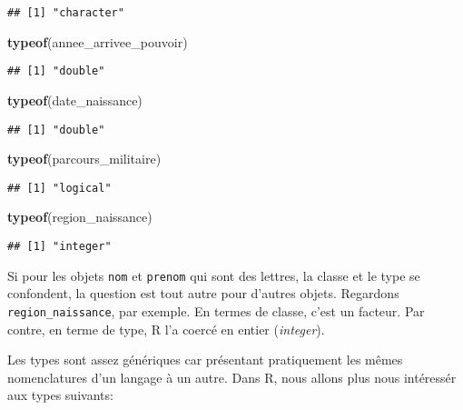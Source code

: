 \documentclass[]{book}
\newenvironment{Shaded}{\begin{snugshade}}{\end{snugshade}}
\newcommand{\KeywordTok}[1]{\textcolor[rgb]{0.13,0.29,0.53}{\textbf{#1}}}
\newcommand{\NormalTok}[1]{#1}
\begin{document}
\begin{verbatim}
## [1] "character"
\end{verbatim}

\begin{Shaded}
\begin{Highlighting}[]
\KeywordTok{typeof}\NormalTok{(annee_arrivee_pouvoir)}
\end{Highlighting}
\end{Shaded}

\begin{verbatim}
## [1] "double"
\end{verbatim}

\begin{Shaded}
\begin{Highlighting}[]
\KeywordTok{typeof}\NormalTok{(date_naissance)}
\end{Highlighting}
\end{Shaded}

\begin{verbatim}
## [1] "double"
\end{verbatim}

\begin{Shaded}
\begin{Highlighting}[]
\KeywordTok{typeof}\NormalTok{(parcours_militaire)}
\end{Highlighting}
\end{Shaded}

\begin{verbatim}
## [1] "logical"
\end{verbatim}

\begin{Shaded}
\begin{Highlighting}[]
\KeywordTok{typeof}\NormalTok{(region_naissance)}
\end{Highlighting}
\end{Shaded}

\begin{verbatim}
## [1] "integer"
\end{verbatim}

Si pour les objets \texttt{nom} et \texttt{prenom} qui sont des lettres,
la classe et le type se confondent, la question est tout autre pour
d'autres objets. Regardons \texttt{region\_naissance}, par exemple. En
termes de classe, c'est un facteur. Par contre, en terme de type, R l'a
coercé en entier (\emph{integer}).

Les types sont assez génériques car présentant pratiquement les mêmes
nomenclatures d'un langage à un autre. Dans R, nous allons plus nous
intéressér aux types suivants:
\end{document}
